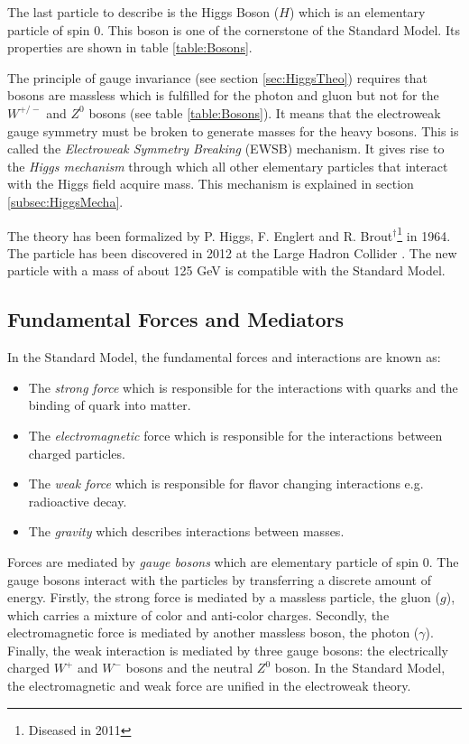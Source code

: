 The last particle to describe is the Higgs Boson ($H$) which is an elementary particle of spin 0. This boson is one of the cornerstone of the Standard Model. Its properties are shown in table \ref{table:Bosons}.

The principle of gauge invariance (see section \ref{sec:HiggsTheo}) requires that bosons are massless which is fulfilled for the photon and gluon but not for the $W^{+/-}$ and $Z^0$ bosons (see table \ref{table:Bosons}). It means that the electroweak gauge symmetry must be broken to generate masses for the heavy bosons. This is called the \textit{Electroweak Symmetry Breaking} (EWSB) mechanism. It gives rise to the \textit{Higgs mechanism} through which all other elementary particles that interact with the Higgs field acquire mass. This mechanism is explained in section \ref{subsec:HiggsMecha}.

The theory \cite{Higgs:1964pj, Englert:1964et} has been formalized by P. Higgs, F. Englert and R. Brout$^\dagger$\footnote{Diseased in 2011} in 1964. The particle has been discovered in 2012 at the Large Hadron Collider \cite{Aad:2012tfa, Chatrchyan:2012xdj}. The new particle with a mass of about 125 GeV is compatible with the Standard Model.

\subsection{Fundamental Forces and Mediators}
\label{subsec:Mediators}

In the Standard Model, the fundamental forces and interactions are known as:
\begin{itemize}
  \item The \textit{strong force} which is responsible for the interactions with quarks and the binding of quark into matter.
  \item The \textit{electromagnetic} force which is responsible for the interactions between charged particles.
  \item The \textit{weak force} which is responsible for flavor changing interactions e.g. radioactive decay.
  \item The \textit{gravity} which describes interactions between masses.
\end{itemize}

Forces are mediated by \textit{gauge bosons} which are elementary particle of spin 0. The gauge bosons interact with the particles by transferring a discrete amount of energy. Firstly, the strong force is mediated by a massless particle, the gluon ($g$), which carries a mixture of color and anti-color charges. Secondly, the electromagnetic force is mediated by another massless boson, the photon ($\gamma$). Finally, the weak interaction is mediated by three gauge bosons: the electrically charged $W^+$ and $W^-$ bosons and the neutral $Z^0$ boson. In the Standard Model, the electromagnetic and weak force are unified in the electroweak theory.


